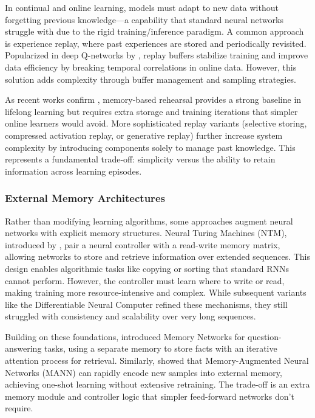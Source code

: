 \documentclass{article} %
\begin{document}
In continual and online learning, models must adapt to new data without forgetting previous knowledge—a capability that standard neural networks struggle with due to the rigid training/inference paradigm. A common approach is experience replay, where past experiences are stored and periodically revisited. Popularized in deep Q-networks by \citet{mnihHumanlevelControlDeep2015}, replay buffers stabilize training and improve data efficiency by breaking temporal correlations in online data. However, this solution adds complexity through buffer management and sampling strategies.

As recent works confirm \citet{Forgetting_Survey_2024}, memory-based rehearsal provides a strong baseline in lifelong learning but requires extra storage and training iterations that simpler online learners would avoid. More sophisticated replay variants (selective storing, compressed activation replay, or generative replay) further increase system complexity by introducing components solely to manage past knowledge. This represents a fundamental trade-off: simplicity versus the ability to retain information across learning episodes.

\subsubsection{External Memory Architectures}

Rather than modifying learning algorithms, some approaches augment neural networks with explicit memory structures. Neural Turing Machines (NTM), introduced by \citet{Graves2014NeuralTM}, pair a neural controller with a read-write memory matrix, allowing networks to store and retrieve information over extended sequences. This design enables algorithmic tasks like copying or sorting that standard RNNs cannot perform. However, the controller must learn where to write or read, making training more resource-intensive and complex. While subsequent variants like the Differentiable Neural Computer refined these mechanisms, they still struggled with consistency and scalability over very long sequences.

Building on these foundations, \citet{westonMemoryNetworks2014} introduced Memory Networks for question-answering tasks, using a separate memory to store facts with an iterative attention process for retrieval. Similarly, \citet{santoroMetaLearningMemoryAugmentedNeural2016} showed that Memory-Augmented Neural Networks (MANN) can rapidly encode new samples into external memory, achieving one-shot learning without extensive retraining. The trade-off is an extra memory module and controller logic that simpler feed-forward networks don't require.
\end{document}
